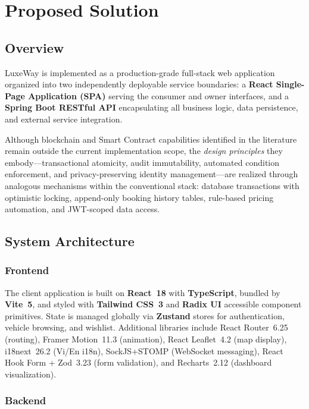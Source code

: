 \section{Proposed Solution}

\subsection{Overview}

LuxeWay is implemented as a production-grade full-stack web application
organized into two independently deployable service boundaries: a
\textbf{React Single-Page Application (SPA)} serving the consumer and
owner interfaces, and a \textbf{Spring Boot RESTful API} encapsulating
all business logic, data persistence, and external service integration.

Although blockchain and Smart Contract capabilities identified in the
literature remain outside the current implementation scope, the
\textit{design principles} they embody---transactional atomicity, audit
immutability, automated condition enforcement, and privacy-preserving
identity management---are realized through analogous mechanisms within
the conventional stack: database transactions with optimistic locking,
append-only booking history tables, rule-based pricing automation, and
JWT-scoped data access.

\subsection{System Architecture}

\subsubsection{Frontend}

The client application is built on \textbf{React~18} with
\textbf{TypeScript}, bundled by \textbf{Vite~5}, and styled with
\textbf{Tailwind CSS~3} and \textbf{Radix UI} accessible component
primitives. State is managed globally via \textbf{Zustand} stores for
authentication, vehicle browsing, and wishlist. Additional libraries
include React Router~6.25 (routing), Framer Motion~11.3 (animation),
React Leaflet~4.2 (map display), i18next~26.2 (Vi/En i18n),
SockJS+STOMP (WebSocket messaging), React Hook Form + Zod~3.23 (form
validation), and Recharts~2.12 (dashboard visualization).

\subsubsection{Backend}

